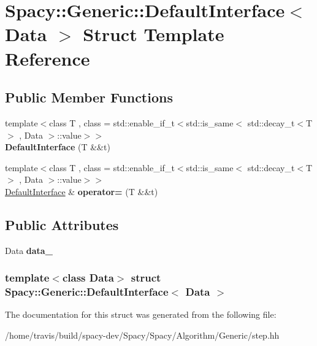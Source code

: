 \hypertarget{structSpacy_1_1Generic_1_1DefaultInterface}{\section{\-Spacy\-:\-:\-Generic\-:\-:\-Default\-Interface$<$ \-Data $>$ \-Struct \-Template \-Reference}
\label{structSpacy_1_1Generic_1_1DefaultInterface}
}
\subsection*{\-Public \-Member \-Functions}
\begin{DoxyCompactItemize}
\item 
\hypertarget{structSpacy_1_1Generic_1_1DefaultInterface_a77f00f53c09087dab3cb751f1580b327}{{\footnotesize template$<$class T , class  = std\-::enable\-\_\-if\-\_\-t$<$std\-::is\-\_\-same$<$ std\-::decay\-\_\-t$<$\-T$>$ , Data $>$\-::value$>$$>$ }\\{\bfseries \-Default\-Interface} (\-T \&\&t)}\label{structSpacy_1_1Generic_1_1DefaultInterface_a77f00f53c09087dab3cb751f1580b327}

\item 
\hypertarget{structSpacy_1_1Generic_1_1DefaultInterface_ac439759218c6df1f8f7cbf38e4be51a5}{{\footnotesize template$<$class T , class  = std\-::enable\-\_\-if\-\_\-t$<$std\-::is\-\_\-same$<$ std\-::decay\-\_\-t$<$\-T$>$ , Data $>$\-::value$>$$>$ }\\\hyperlink{structSpacy_1_1Generic_1_1DefaultInterface}{\-Default\-Interface} \& {\bfseries operator=} (\-T \&\&t)}\label{structSpacy_1_1Generic_1_1DefaultInterface_ac439759218c6df1f8f7cbf38e4be51a5}

\end{DoxyCompactItemize}
\subsection*{\-Public \-Attributes}
\begin{DoxyCompactItemize}
\item 
\hypertarget{structSpacy_1_1Generic_1_1DefaultInterface_afacc26987a814ebe95292ff45c9744bd}{\-Data {\bfseries data\-\_\-}}\label{structSpacy_1_1Generic_1_1DefaultInterface_afacc26987a814ebe95292ff45c9744bd}

\end{DoxyCompactItemize}
\subsubsection*{template$<$class Data$>$ struct Spacy\-::\-Generic\-::\-Default\-Interface$<$ Data $>$}



\-The documentation for this struct was generated from the following file\-:\begin{DoxyCompactItemize}
\item 
/home/travis/build/spacy-\/dev/\-Spacy/\-Spacy/\-Algorithm/\-Generic/step.\-hh\end{DoxyCompactItemize}
